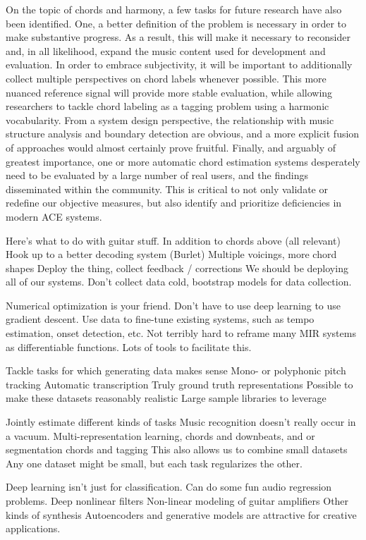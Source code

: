 On the topic of chords and harmony, a few tasks for future research have also been identified.
One, a better definition of the problem is necessary in order to make substantive progress.
As a result, this will make it necessary to reconsider and, in all likelihood, expand the music content used for development and evaluation.
In order to embrace subjectivity, it will be important to additionally collect multiple perspectives on chord labels whenever possible.
This more nuanced reference signal will provide more stable evaluation, while allowing researchers to tackle chord labeling as a tagging problem using a harmonic vocabularity.
From a system design perspective, the relationship with music structure analysis and boundary detection are obvious, and a more explicit fusion of approaches would almost certainly prove fruitful.
Finally, and arguably of greatest importance, one or more automatic chord estimation systems desperately need to be evaluated by a large number of real users, and the findings disseminated within the community.
This is critical to not only validate or redefine our objective measures, but also identify and prioritize deficiencies in modern ACE systems.

Here's what to do with guitar stuff.
In addition to chords above (all relevant)
Hook up to a better decoding system (Burlet)
Multiple voicings, more chord shapes
Deploy the thing, collect feedback / corrections
We should be deploying all of our systems.
Don't collect data cold, bootstrap models for data collection.

Numerical optimization is your friend.
Don't have to use deep learning to use gradient descent.
Use data to fine-tune existing systems, such as tempo estimation, onset detection, etc.
Not terribly hard to reframe many MIR systems as differentiable functions.
Lots of tools to facilitate this.

Tackle tasks for which generating data makes sense
Mono- or polyphonic pitch tracking
Automatic transcription
Truly ground truth representations
Possible to make these datasets reasonably realistic
Large sample libraries to leverage

Jointly estimate different kinds of tasks
Music recognition doesn't really occur in a vacuum.
Multi-representation learning, chords and downbeats, and or segmentation
chords and tagging
This also allows us to combine small datasets
Any one dataset might be small, but each task regularizes the other.

Deep learning isn't just for classification.
Can do some fun audio regression problems.
Deep nonlinear filters
Non-linear modeling of guitar amplifiers
Other kinds of synthesis
Autoencoders and generative models are attractive for creative applications.


